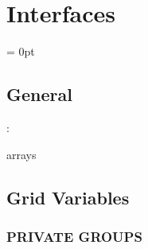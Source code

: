 
\section{Interfaces} 


\parskip = 0pt

\vspace{3mm} \subsection*{General}

: 

arrays
\vspace{2mm}
\subsection*{Grid Variables}
\vspace{5mm}\subsubsection{PRIVATE GROUPS}

\vspace{5mm}

